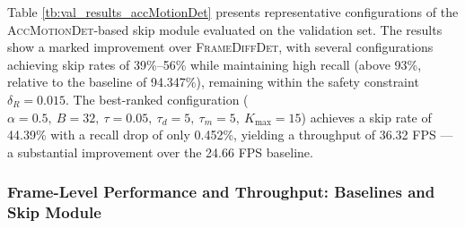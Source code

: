 \documentclass[
  10pt,
]{article}
\begin{document}
Table \ref{tb:val_results_accMotionDet} presents representative
configurations of the \textsc{AccMotionDet}-based skip module evaluated
on the validation set. The results show a marked improvement over
\textsc{FrameDiffDet}, with several configurations achieving skip rates
of 39\%--56\% while maintaining high recall (above 93\%, relative to the
baseline of 94.347\%), remaining within the safety constraint
\(\delta_R = 0.015\). The best-ranked configuration (\(\alpha{=}0.5,\
B{=}32,\ \tau{=}0.05,\ \tau_d{=}5,\ \tau_m{=}5,\
K_{\max}{=}15\)) achieves a skip rate of 44.39\% with a recall drop of
only 0.452\%, yielding a throughput of 36.32 FPS --- a substantial
improvement over the 24.66 FPS baseline.

\subsubsection{Frame-Level Performance and Throughput: Baselines and
Skip Module}\label{sec:e2e-perf}

\begin{table}[htbp]
    \caption{Frame-level performance and throughput of the proposed pipeline
    against lightweight fire-and-smoke detectors on the test set. ``Big
    Model with Skip Module'' refers to the full proposed pipeline. Recall,
    FAR, Accuracy, and Precision are reported in percentage (\%); FPS is
    averaged across all frames in the test videos. GFLOPs denotes the static
    per-frame floating-point operations ($10^9$) of the detection model. The
    best and second-best values per metric are highlighted in \textbf{bold} and
    \underline{\textit{italic underline}}, respectively.}
    \label{tb:perf_per_frame}
\end{table}
\end{document}
